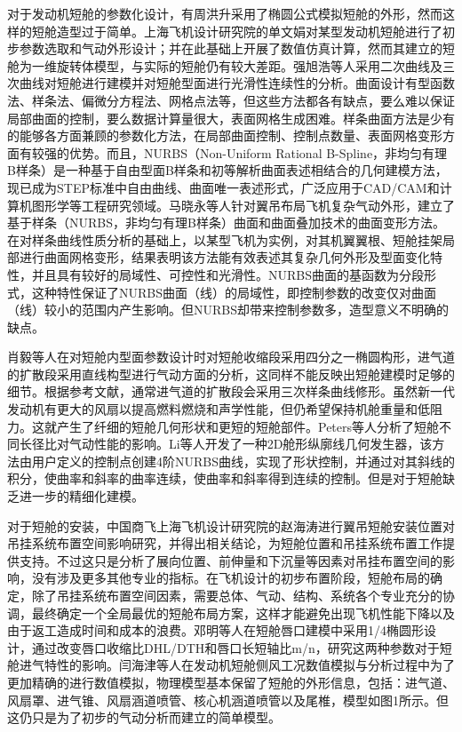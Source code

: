 \documentclass[12pt,a4paper]{report}
\begin{document}
对于发动机短舱的参数化设计，有周洪升采用了椭圆公式模拟短舱的外形，然而这样的短舱造型过于简单。上海飞机设计研究院的单文娟对某型发动机短舱进行了初步参数选取和气动外形设计；并在此基础上开展了数值仿真计算，然而其建立的短舱为一维旋转体模型，与实际的短舱仍有较大差距。强旭浩等人采用二次曲线及三次曲线对短舱进行建模并对短舱型面进行光滑性连续性的分析。曲面设计有型函数法、样条法、偏微分方程法、网格点法等，但这些方法都各有缺点，要么难以保证局部曲面的控制，要么数据计算量很大，表面网格生成困难。样条曲面方法是少有的能够各方面兼顾的参数化方法，在局部曲面控制、控制点数量、表面网格变形方面有较强的优势。而且，NURBS（Non-Uniform Rational B-Spline，非均匀有理B样条）是一种基于自由型面B样条和初等解析曲面表述相结合的几何建模方法，现已成为STEP标准中自由曲线、曲面唯一表述形式，广泛应用于CAD/CAM和计算机图形学等工程研究领域。马晓永等人针对翼吊布局飞机复杂气动外形，建立了基于样条（NURBS，非均匀有理B样条）曲面和曲面叠加技术的曲面变形方法。在对样条曲线性质分析的基础上，以某型飞机为实例，对其机翼翼根、短舱挂架局部进行曲面网格变形，结果表明该方法能有效表述其复杂几何外形及型面变化特性，并且具有较好的局域性、可控性和光滑性。NURBS曲面的基函数为分段形式，这种特性保证了NURBS曲面（线）的局域性，即控制参数的改变仅对曲面（线）较小的范围内产生影响。但NURBS却带来控制参数多，造型意义不明确的缺点。 

肖毅等人在对短舱内型面参数设计时对短舱收缩段采用四分之一椭圆构形，进气道的扩散段采用直线构型进行气动方面的分析，这同样不能反映出短舱建模时足够的细节。根据参考文献，通常进气道的扩散段会采用三次样条曲线修形。虽然新一代发动机有更大的风扇以提高燃料燃烧和声学性能，但仍希望保持机舱重量和低阻力。这就产生了纤细的短舱几何形状和更短的短舱部件。Peters等人分析了短舱不同长径比对气动性能的影响。Li等人开发了一种2D舱形纵廓线几何发生器，该方法由用户定义的控制点创建4阶NURBS曲线，实现了形状控制，并通过对其斜线的积分，使曲率和斜率的曲率连续，使曲率和斜率得到连续的控制。但是对于短舱缺乏进一步的精细化建模。

对于短舱的安装，中国商飞上海飞机设计研究院的赵海涛进行翼吊短舱安装位置对吊挂系统布置空间影响研究，并得出相关结论，为短舱位置和吊挂系统布置工作提供支持。不过这只是分析了展向位置、前伸量和下沉量等因素对吊挂布置空间的影响，没有涉及更多其他专业的指标。在飞机设计的初步布置阶段，短舱布局的确定，除了吊挂系统布置空间因素，需要总体、气动、结构、系统各个专业充分的协调，最终确定一个全局最优的短舱布局方案，这样才能避免出现飞机性能下降以及由于返工造成时间和成本的浪费。邓明等人在短舱唇口建模中采用1/4椭圆形设计，通过改变唇口收缩比DHL/DTH和唇口长短轴比m/n，研究这两种参数对于短舱进气特性的影响。闫海津等人在发动机短舱侧风工况数值模拟与分析过程中为了更加精确的进行数值模拟，物理模型基本保留了短舱的外形信息，包括：进气道、风扇罩、进气锥、风扇涵道喷管、核心机涵道喷管以及尾椎，模型如图1所示。但这仍只是为了初步的气动分析而建立的简单模型。
\end{document}
